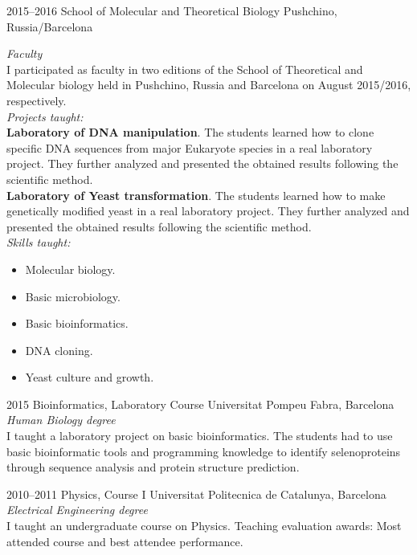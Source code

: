 \documentclass[]{friggeri-cv} %
\begin{document}
\begin{entrylist}

\entry
{2015--2016}
{School of Molecular and Theoretical Biology}
{Pushchino, Russia/Barcelona}
{\emph{Faculty}\\
I participated as faculty in two editions of the School of Theoretical
and Molecular biology held in Pushchino, Russia and Barcelona on
August 2015/2016, respectively.\\
{\em Projects taught:}\\
{\bf Laboratory of DNA manipulation}. The students learned how to clone specific DNA
sequences from major Eukaryote species in a real laboratory
project. They further analyzed and presented the obtained results
following the scientific method. \\
{\bf Laboratory of Yeast transformation}. The students learned how to make genetically
modified yeast in a real laboratory project. They further analyzed and
presented the obtained results following the scientific method. \\
{\em Skills taught:}
\begin{itemize}
  \item Molecular biology.
  \item Basic microbiology.
  \item Basic bioinformatics.
  \item DNA cloning.
  \item Yeast culture and growth.
\end{itemize}
}


\end{entrylist}
\begin{entrylist}



\entry
{2015}
{Bioinformatics, Laboratory Course}
{Universitat Pompeu Fabra, Barcelona}
{\emph{Human Biology degree} \\
I taught a laboratory project on basic bioinformatics. The students
had to use basic bioinformatic tools and programming knowledge to
identify selenoproteins through sequence analysis and protein
structure prediction.} 


\entry
{2010--2011}
{Physics, Course I}
{Universitat Politecnica de Catalunya, Barcelona}
{\emph{Electrical Engineering degree} \\
I taught an undergraduate course on Physics. Teaching evaluation
awards: Most attended course and best attendee performance.
}


\end{entrylist}
\end{document}
